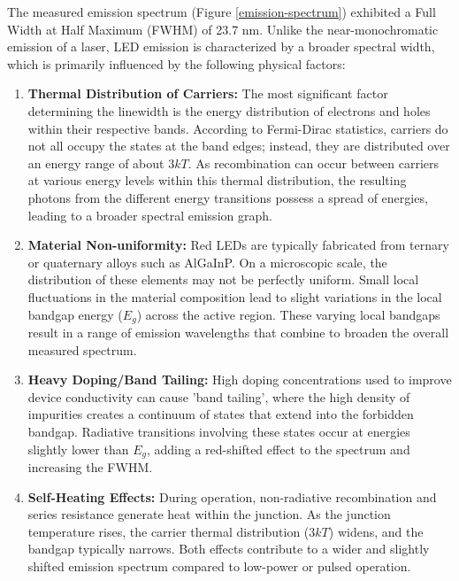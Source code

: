 \documentclass[1pt]{article}
\begin{document}
The measured emission spectrum (Figure \ref{emission-spectrum}) exhibited a Full Width at Half Maximum (FWHM) of 23.7 nm. Unlike the near-monochromatic emission of a laser, LED emission is characterized by a broader spectral width, which is primarily influenced by the following physical factors:

\begin{enumerate}
    \item \textbf{Thermal Distribution of Carriers:} 
    The most significant factor determining the linewidth is the energy distribution of electrons and holes within their respective bands. According to Fermi-Dirac statistics, carriers do not all occupy the states at the band edges; instead, they are distributed over an energy range of about $3kT$. As recombination can occur between carriers at various energy levels within this thermal distribution, the resulting photons from the different energy transitions possess a spread of energies, leading to a broader spectral emission graph.

    \item \textbf{Material Non-uniformity:} 
    Red LEDs are typically fabricated from ternary or quaternary alloys such as AlGaInP. On a microscopic scale, the distribution of these elements may not be perfectly uniform. Small local fluctuations in the material composition lead to slight variations in the local bandgap energy ($E_g$) across the active region. These varying local bandgaps result in a range of emission wavelengths that combine to broaden the overall measured spectrum.

    \item \textbf{Heavy Doping/Band Tailing:} 
    High doping concentrations used to improve device conductivity can cause 'band tailing', where the high density of impurities creates a continuum of states that extend into the forbidden bandgap. Radiative transitions involving these states occur at energies slightly lower than $E_g$, adding a red-shifted effect to the spectrum and increasing the FWHM.

    \item \textbf{Self-Heating Effects:} 
    During operation, non-radiative recombination and series resistance generate heat within the junction. As the junction temperature rises, the carrier thermal distribution ($3kT$) widens, and the bandgap typically narrows. Both effects contribute to a wider and slightly shifted emission spectrum compared to low-power or pulsed operation.
\end{enumerate}
\end{document}
